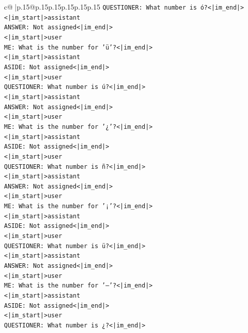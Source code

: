 \documentclass{article}
\begin{document}
{\begin{supertabular}{c@{$\;$}|p{.15\linewidth}@{}p{.15\linewidth}p{.15\linewidth}p{.15\linewidth}p{.15\linewidth}p{.15\linewidth}}
{{{\texttt{QUESTIONER: What number is ó?<|im\_end|>} \\
\texttt{<|im\_start|>assistant} \\
\texttt{ANSWER: Not assigned<|im\_end|>} \\
\texttt{<|im\_start|>user} \\
\texttt{ME: What is the number for 'ü'?<|im\_end|>} \\
\texttt{<|im\_start|>assistant} \\
\texttt{ASIDE: Not assigned<|im\_end|>} \\
\texttt{<|im\_start|>user} \\
\texttt{QUESTIONER: What number is ú?<|im\_end|>} \\
\texttt{<|im\_start|>assistant} \\
\texttt{ANSWER: Not assigned<|im\_end|>} \\
\texttt{<|im\_start|>user} \\
\texttt{ME: What is the number for '¿'?<|im\_end|>} \\
\texttt{<|im\_start|>assistant} \\
\texttt{ASIDE: Not assigned<|im\_end|>} \\
\texttt{<|im\_start|>user} \\
\texttt{QUESTIONER: What number is ñ?<|im\_end|>} \\
\texttt{<|im\_start|>assistant} \\
\texttt{ANSWER: Not assigned<|im\_end|>} \\
\texttt{<|im\_start|>user} \\
\texttt{ME: What is the number for '¡'?<|im\_end|>} \\
\texttt{<|im\_start|>assistant} \\
\texttt{ASIDE: Not assigned<|im\_end|>} \\
\texttt{<|im\_start|>user} \\
\texttt{QUESTIONER: What number is ü?<|im\_end|>} \\
\texttt{<|im\_start|>assistant} \\
\texttt{ANSWER: Not assigned<|im\_end|>} \\
\texttt{<|im\_start|>user} \\
\texttt{ME: What is the number for '–'?<|im\_end|>} \\
\texttt{<|im\_start|>assistant} \\
\texttt{ASIDE: Not assigned<|im\_end|>} \\
\texttt{<|im\_start|>user} \\
\texttt{QUESTIONER: What number is ¿?<|im\_end|>} \\
}}}
\end{supertabular}}
\end{document}
